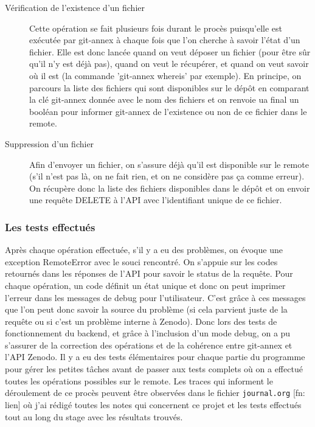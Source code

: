\documentclass[11pt]{article}
\begin{document}
\begin{description}
\item[{Vérification de l'existence d'un fichier}] Cette opération se fait plusieurs fois durant le procès puisqu'elle
est exécutée par git-annex à chaque fois que l'on cherche à savoir
l'état d'un fichier. Elle est donc lancée quand on
veut déposer un fichier (pour être sûr qu'il n'y est déjà pas),
quand on veut le récupérer, et quand on veut savoir où il est (la
commande 'git-annex whereis' par exemple).
En principe, on parcours la liste des fichiers qui sont disponibles
sur le dépôt en comparant la clé git-annex donnée avec le nom des
fichiers et on renvoie ua final un booléan pour informer git-annex
de l'existence ou non de ce fichier dans le remote.

\item[{Suppression d'un fichier}] Afin d'envoyer un fichier, on s'assure déjà qu'il est disponible sur
le remote (s'il n'est pas là, on ne fait rien, et on ne considère
pas ça comme erreur). On récupère donc la liste des fichiers
disponibles dans le dépôt et on envoir une requête DELETE à l'API
avec l'identifiant unique de ce fichier.
\end{description}

\subsubsection{Les tests effectués}
\label{sec:orgbb06810}
Après chaque opération effectuée, s'il y a eu des problèmes, on évoque
une exception RemoteError avec le souci rencontré. On s'appuie sur
les codes retournés dans les réponses de l'API pour savoir le status
de la requête. Pour chaque opération, un code définit un état unique
et donc on peut imprimer l'erreur dans les messages de debug pour
l'utilisateur. C'est grâce à ces messages que l'on peut donc savoir
la source du problème (si cela parvient juste de la requête ou si
c'est un problème interne à Zenodo). 
Donc lors des tests de fonctionnement du backend, et grâce à
l'inclusion d'un mode debug, on a pu s'assurer de la correction des
opérations et de la cohérence entre git-annex et l'API Zenodo.
Il y a eu des tests élémentaires pour chaque partie du programme
pour gérer les petites tâches avant de passer aux tests complets où
on a effectué toutes les opérations possibles sur le remote.
Les traces qui informent le déroulement de ce procès peuvent être
observées dans le fichier \texttt{journal.org}  [fn: lien] où j'ai rédigé toutes les
notes qui concernent ce projet et les tests effectués tout au long
du stage avec les résultats trouvés.
\end{document}
